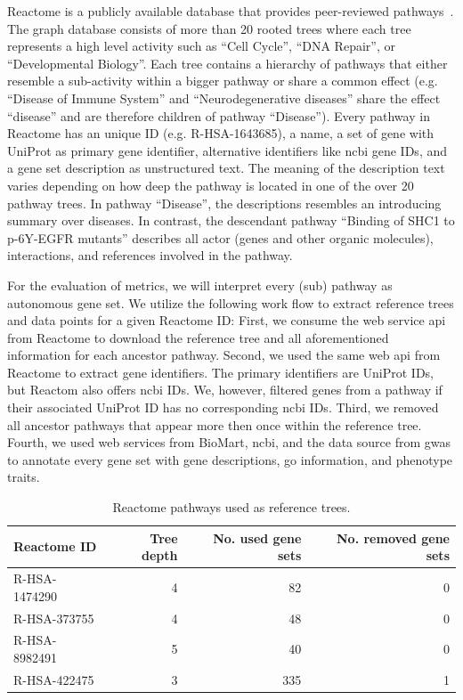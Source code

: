 \documentclass{thesisclass}
\begin{document}
Reactome is a publicly available database that provides peer-reviewed pathways~\cite{doi:10.1093/nar/gki072}. 
The graph database consists of more than 20 rooted trees where each tree represents a high level activity such as ``Cell Cycle'', ``DNA Repair'', or ``Developmental Biology''.
Each tree contains a hierarchy of pathways that either resemble a sub-activity within a bigger pathway or share a common effect (e.g. ``Disease of Immune System'' and ``Neurodegenerative diseases'' share the effect ``disease'' and are therefore children of pathway ``Disease''). 
Every pathway in Reactome has an unique ID (e.g. R-HSA-1643685), a name, a set of gene with UniProt as primary gene identifier, alternative identifiers like \acrshort{ncbi} gene IDs, and a gene set description as unstructured text. 
The meaning of the description text varies depending on how deep the pathway is located in one of the over 20 pathway trees. In pathway ``Disease'', the descriptions resembles an introducing summary over diseases. In contrast, the descendant pathway ``Binding of SHC1 to p-6Y-EGFR mutants'' describes all actor (genes and other organic molecules), interactions, and references involved in the pathway.

For the evaluation of metrics, we will interpret every (sub) pathway as autonomous gene set. We utilize the following work flow to extract reference trees and data points for a given Reactome ID: 
First, we consume the web service \acrshort{api} from Reactome to download the reference tree and all aforementioned information for each ancestor pathway.
Second, we used the same web \acrshort{api} from Reactome to extract gene identifiers. The primary identifiers are UniProt IDs, but Reactom also offers \acrshort{ncbi} IDs. 
We, however, filtered genes from a pathway if their associated UniProt ID has no corresponding \acrfull{ncbi} IDs.
Third, we removed all ancestor pathways that appear more then once within the reference tree. 
Fourth, we used web services from BioMart, \acrshort{ncbi}, and the data source from \acrfull{gwas} to annotate every gene set with gene descriptions, \acrshort{go} information, and phenotype traits.

\begin{table}[!ht]
	\centering
	\begin{tabular}{l|r|r|r}
		Reactome ID & Tree depth & No. used gene sets & No. removed gene sets \\
		\hline
		R-HSA-1474290 & 4 & 82 & 0 \\
		R-HSA-373755 & 4 & 48 & 0 \\
		R-HSA-8982491 & 5 & 40 & 0 \\
		R-HSA-422475 & 3 & 335 & 1 \\
	\end{tabular}
	\caption{Reactome pathways used as reference trees.}
	\label{fig:reactome_trees}
\end{table}
\end{document}
